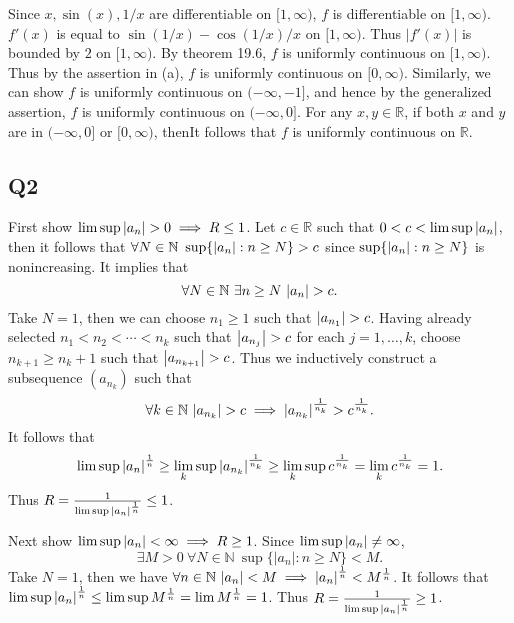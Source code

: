 \documentclass[12pt,lettersize]{article}
\newcommand{\R}{\mathbb{R}}
\newcommand{\N}{\mathbb{N}}
\begin{document}
\begin{enumerate}[(a)]
		Since $x,\sin(x),1/x$ are differentiable on $[1,\infty)$, $f$ is differentiable on $[1,\infty)$. $f'(x)$ is equal to $\sin(1/x)-\cos(1/x)/x$ on $[1,\infty)$. Thus $|f'(x)|$ is bounded by $2$ on $[1,\infty)$. By theorem 19.6, $f$ is uniformly continuous on $[1,\infty)$. Thus by the assertion in (a), $f$ is uniformly continuous on $[0,\infty)$. Similarly, we can show $f$ is uniformly continuous on $(-\infty,-1]$, and hence by the generalized assertion, $f$ is uniformly continuous on $(-\infty,0]$. For any $x,y\in\R$, if both $x$ and $y$ are in $(-\infty,0]$ or $[0,\infty)$, thenIt follows that $f$ is uniformly continuous on $\R$. 
		
	\end{enumerate}
	\newpage
	
	\subsection*{Q2}
	First show $\lim\sup\abs{a_n}>0\implies R\leq 1$. Let $c\in\R$ such that $0<c<\lim\sup\abs{a_n}$, then it follows that $\forall N\in\N\ \sup\{\abs{a_n}:n\geq N\}>c$ since $\sup\{\abs{a_n}:n\geq N\}$ is nonincreasing. It implies that \begin{displaymath}
		\forall N\in\N\ \exists n\geq N\ \abs{a_n}>c.
	\end{displaymath}
	Take $N=1$, then we can choose $n_1\geq1$ such that $\abs{a_{n_1}}>c$. Having already selected $n_1<n_2<\cdots<n_k$ such that $\abs{a_{n_j}}>c$ for each $j=1,\dots,k$, choose $n_{k+1}\geq n_k+1$ such that $\abs{a_{n_{k+1}}}>c$. Thus we inductively construct a subsequence $(a_{n_k})$ such that
	\begin{displaymath}
		\forall k\in\N\ \abs{a_{n_k}}>c\implies \abs{a_{n_k}}^\frac{1}{n_k}>c^\frac{1}{n_k}.
	\end{displaymath}
	It follows that
	\begin{displaymath}
		\lim\sup\abs{a_n}^\frac{1}{n}\geq\lim_k\sup\abs{a_{n_k}}^\frac{1}{n_k}\geq\lim_k\sup c^\frac{1}{n_k}=\lim_k c^\frac{1}{n_k}=1.
	\end{displaymath}
	Thus $R=\frac{1}{\lim\sup\abs{a_n}^\frac{1}{n}}\leq 1$.\smallskip
	
	Next show $\lim\sup\abs{a_n}<\infty\implies R\geq 1$. Since $\lim\sup\abs{a_n}\neq\infty$,
	\begin{displaymath}
		\exists M>0\ \forall N\in\N\ \sup\{|a_n|:n\geq N\}<M.
	\end{displaymath}
	Take $N=1$, then we have $\forall n\in\N\ \abs{a_n}<M\implies \abs{a_n}^\frac{1}{n}<M^\frac{1}{n}$. It follows that $\lim\sup\abs{a_n}^\frac{1}{n}\leq\lim\sup M^\frac{1}{n}=\lim M^\frac{1}{n}=1$. Thus $R=\frac{1}{\lim\sup\abs{a_n}^\frac{1}{n}}\geq 1$.\smallskip
	
\end{document}
